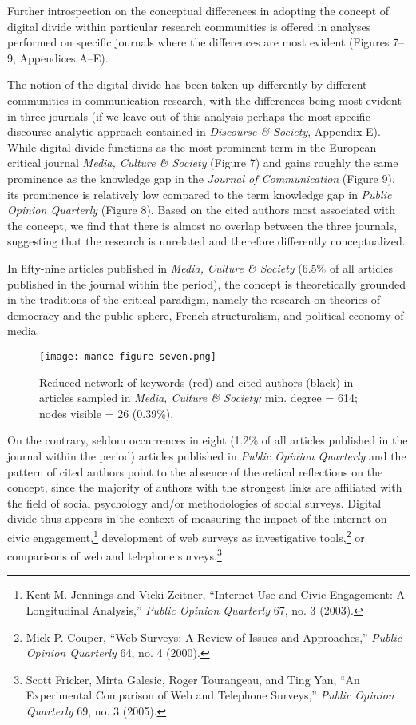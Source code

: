 \documentclass{tufte-handout}
\begin{document}
Further introspection on the conceptual differences in adopting the
concept of digital divide within particular research communities is
offered in analyses performed on specific journals where the differences
are most evident (Figures 7--9, Appendices A--E).

The notion of the digital divide has been taken up differently by
different communities in communication research, with the differences
being most evident in three journals (if we leave out of this analysis
perhaps the most specific discourse analytic approach contained in
\emph{Discourse \& Society}, Appendix E). While digital divide functions
as the most prominent term in the European critical journal \emph{Media,
Culture \& Society} (Figure 7) and gains roughly the same prominence as
the knowledge gap in the \emph{Journal of Communication} (Figure 9), its
prominence is relatively low compared to the term knowledge gap in
\emph{Public Opinion Quarterly} (Figure 8). Based on the cited authors
most associated with the concept, we find that there is almost no
overlap between the three journals, suggesting that the research is
unrelated and therefore differently conceptualized.

In fifty-nine articles published in \emph{Media, Culture \& Society}
(6.5\% of all articles published in the journal within the period), the
concept is theoretically grounded in the traditions of the critical
paradigm, namely the research on theories of democracy and the public
sphere, French structuralism, and political economy of media.

\begin{figure}
    \centering
    \texttt{[image: mance-figure-seven.png]}
    \caption{Reduced network of keywords (red) and cited authors (black) in
articles sampled in \emph{Media, Culture \& Society;} min. degree = 614;
nodes visible = 26 (0.39\%).}
    \label{fig:seven}
\end{figure}


On the contrary, seldom occurrences in eight (1.2\% of all articles
published in the journal within the period) articles published in
\emph{Public Opinion Quarterly} and the pattern of cited authors point
to the absence of theoretical reflections on the concept, since the
majority of authors with the strongest links are affiliated with the
field of social psychology and/or methodologies of social surveys.
Digital divide thus appears in the context of measuring the impact of
the internet on civic engagement,\footnote{Kent M. Jennings and Vicki
  Zeitner, ``Internet Use and Civic Engagement: A Longitudinal
  Analysis,'' \emph{Public Opinion Quarterly} 67, no. 3 (2003).}
development of web surveys as investigative tools,\footnote{Mick P.
  Couper, ``Web Surveys: A Review of Issues and Approaches,''
  \emph{Public Opinion Quarterly} 64, no. 4 (2000).} or comparisons of
web and telephone surveys.\footnote{Scott Fricker, Mirta Galesic, Roger
  Tourangeau, and Ting Yan, ``An Experimental Comparison of Web and
  Telephone Surveys,'' \emph{Public Opinion Quarterly} 69, no. 3 (2005).}
  
\end{document}
